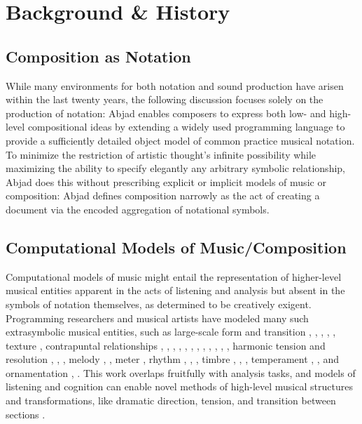 \section{Background \& History}\label{sec:background}

\subsection{Composition as Notation}
While many environments for both notation and sound production have arisen within the last twenty years, the following discussion focuses solely on the production of notation: Abjad enables composers to express both low- and high-level compositional ideas by extending a widely used programming language to provide a sufficiently detailed object model of common practice musical notation. To minimize the restriction of artistic thought's infinite possibility while maximizing the ability to specify elegantly any arbitrary symbolic relationship, Abjad does this without prescribing explicit or implicit models of music or composition: Abjad defines composition narrowly as the act of creating a document via the encoded aggregation of notational symbols.

\subsection{Computational Models of Music/Composition}

Computational models of music might entail the representation of higher-level musical entities apparent in the acts of listening and analysis but absent in the symbols of notation themselves, as determined to be creatively exigent. Programming researchers and musical artists have modeled many such extrasymbolic musical entities, such as large-scale form and transition \cite{polansky1991morphological}, \cite{uno1994temporal}, \cite{dobrian1995algorithmic}, \cite{abrams1999higher}, \cite{Yoo1983}, texture \cite{Horenstein:2004kx}, contrapuntal relationships \cite{Boenn:2009oq}, \cite{Acevedo2005}, \cite{Anders:2011kl}, \cite{Balser:1990tg}, \cite{Jones:2000hc}, \cite{uno1994temporal}, \cite{Bell:1995ij}, \cite{farbood2001analysis}, \cite{Cope:2002fv}, \cite{Laurson:2005dz}, \cite{Polansky:2011fu}, \cite{Ebcioglu:1980kl}, harmonic tension and resolution \cite{Melo2003}, \cite{Wiggins1999}, \cite{Foster:1995qa}, melody \cite{Hornel:1993mi}, \cite{Smith:1992pi}, meter \cite{Hamanaka:2005ff}, rhythm \cite{Nauert2007}, \cite{Degazio:1996lh}, \cite{Collins:2003bs}, timbre \cite{Xenakis:1991fu}, \cite{Creasey:1996ye}, \cite{Osaka2004}, temperament \cite{Seymour:2007qo}, \cite{Graf:2006il}, and ornamentation \cite{Ariza:2003zt}, \cite{Chico-Topfer:1998jl}. This work overlaps fruitfully with analysis tasks, and models of listening and cognition can enable novel methods of high-level musical structures and transformations, like dramatic direction, tension, and transition between sections \cite[108]{Collins2009}.


